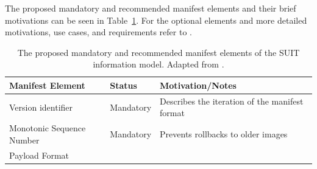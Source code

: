 \documentclass[0-thesis.tex]{subfiles}
\begin{document}
The proposed mandatory and recommended manifest elements and their brief motivations can
be seen in Table~\ref{tab:manifest-elements}. For the optional elements and more detailed
motivations, use cases, and requirements refer to \parencite{suit-information-model}.

\begin{longtable}[]{@{}lll@{}}
    \caption{The proposed mandatory and recommended manifest elements of the SUIT information model. Adapted from \parencite{suit-information-model}.}
    \label{tab:manifest-elements}\\
    \toprule
    \begin{minipage}[b]{0.23\columnwidth}\raggedright\strut
    Manifest Element\strut
    \end{minipage} & \begin{minipage}[b]{0.26\columnwidth}\raggedright\strut
    Status\strut
    \end{minipage} & \begin{minipage}[b]{0.42\columnwidth}\raggedright\strut
    Motivation/Notes\strut
    \end{minipage}\tabularnewline
    \midrule
    \endhead
    \begin{minipage}[t]{0.23\columnwidth}\raggedright\strut
    Version identifier\strut
    \end{minipage} & \begin{minipage}[t]{0.26\columnwidth}\raggedright\strut
    Mandatory\strut
    \end{minipage} & \begin{minipage}[t]{0.42\columnwidth}\raggedright\strut
    Describes the iteration of the manifest format\strut
    \end{minipage}\tabularnewline
    \begin{minipage}[t]{0.23\columnwidth}\raggedright\strut
    Monotonic Sequence Number\strut
    \end{minipage} & \begin{minipage}[t]{0.26\columnwidth}\raggedright\strut
    Mandatory\strut
    \end{minipage} & \begin{minipage}[t]{0.42\columnwidth}\raggedright\strut
    Prevents rollbacks to older images\strut
    \end{minipage}\tabularnewline
    \begin{minipage}[t]{0.23\columnwidth}\raggedright\strut
    Payload Format\strut
    \end{minipage} & \begin{minipage}[t]{0.26\columnwidth}\raggedright\strut

\end{minipage}
\end{longtable}
\end{document}
